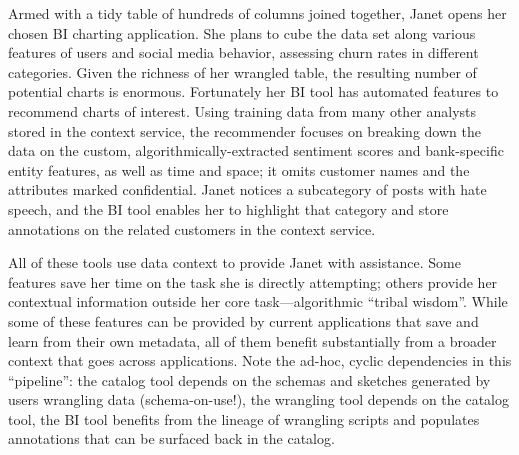 \documentclass{sig-alternate}
\begin{document}
Armed with a tidy table of hundreds of columns joined together, Janet opens her chosen BI charting application. She plans to cube the data set along various features of users and social media behavior, assessing churn rates in different categories. Given the richness of her wrangled table, the resulting number of potential charts is enormous. Fortunately her BI tool has automated features to recommend charts of interest. Using training data from many other analysts stored in the context service, the recommender focuses on breaking down the data on the custom, algorithmically-extracted sentiment scores and bank-specific entity features, as well as time and space; it omits customer names and the attributes marked confidential.  Janet notices a subcategory of posts with hate speech, and the BI tool enables her to highlight that category and store annotations on the related customers in the context service.

All of these tools use data context to provide Janet with assistance. Some features save her time on the task she is directly attempting; others provide her contextual information outside her core task---algorithmic ``tribal wisdom''. While some of these features can be provided by current applications that save and learn from their own metadata, all of them benefit substantially from a broader context that goes across applications. Note the ad-hoc, cyclic dependencies in this ``pipeline'': the catalog tool depends on the schemas and sketches generated by users wrangling data (schema-on-use!), the wrangling tool depends on the catalog tool, the BI tool benefits from the lineage of wrangling scripts and populates annotations that can be surfaced back in the catalog.
\end{document}
